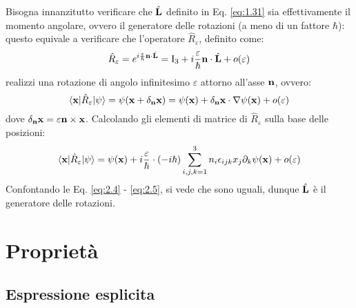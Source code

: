 Bisogna innanzitutto verificare che $ \hat{\mathbf{L}} $ definito in Eq. \ref{eq:1.31} sia effettivamente il momento angolare, ovvero il generatore delle rotazioni (a meno di un fattore $ \hbar $): questo equivale a verificare che l'operatore $ \hat{R}_{\varepsilon} $, definito come:
\begin{equation}
	\hat{R}_{\varepsilon} = e^{i\frac{\varepsilon}{\hbar} \mathbf{n}\cdot\hat{\mathbf{L}}} = \mathbf{\text{I}}_3 + i\frac{\varepsilon}{\hbar} \mathbf{n}\cdot\hat{	\mathbf{L}} + o(\varepsilon)
	\label{eq:2.3}
\end{equation}
realizzi una rotazione di angolo infinitesimo $ \varepsilon $ attorno all'asse $ \mathbf{n} $, ovvero:
\begin{equation}
	\braket{\mathbf{x} | \hat{R}_{\varepsilon} | \psi} = \psi(\mathbf{x} + \delta_{\mathbf{n}}\mathbf{x}) = \psi(\mathbf{x}) + \delta_{\mathbf{n}}\mathbf{x}\cdot\nabla\psi(\mathbf{x}) + o(\varepsilon)
	\label{eq:2.4}
\end{equation}
dove $ \delta_{\mathbf{n}}\mathbf{x} = \varepsilon \mathbf{n}\times\mathbf{x} $. Calcolando gli elementi di matrice di $ \hat{R}_{\varepsilon} $ sulla base delle posizioni:
\begin{equation}
	\braket{\mathbf{x} | \hat{R}_{\varepsilon} | \psi} = \psi(\mathbf{x}) + i \frac{\varepsilon}{\hbar} \cdot (-i\hbar) \sum_{i,j,k = 1}^{3} n_i \epsilon_{ijk} x_j \partial_k \psi(\mathbf{x}) + o(\varepsilon)
	\label{eq:2.5}
\end{equation}
Confontando le Eq. \ref{eq:2.4} - \ref{eq:2.5}, si vede che sono uguali, dunque $ \hat{\mathbf{L}} $ è il generatore delle rotazioni.

\section{Proprietà}

\subsection{Espressione esplicita}

